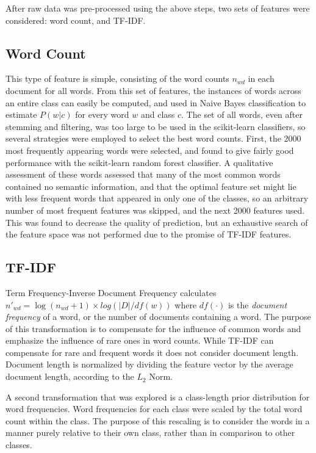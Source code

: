 \documentclass[10pt,twocolumn]{article}
\begin{document}
After raw data was pre-processed using the above steps, two sets of features were considered: word count, and TF-IDF.

\subsection*{Word Count}

This type of feature is simple, consisting of the word counts $n_{wd}$ in each document for all words. From this set of features, the instances of words across an entire class can easily be computed, and used in Naive Bayes classification to estimate $P(w | c)$ for every word $w$ and class $c$. The set of all words, even after stemming and filtering, was too large to be used in the scikit-learn classifiers, so several strategies were employed to select the best word counts.  First, the 2000 most frequently appearing words were selected, and found to give fairly good performance with the scikit-learn random forest classifier.  A qualitative assessment of these words assessed that many of the most common words contained no semantic information, and that the optimal feature set might lie with less frequent words that appeared in only one of the classes, so an arbitrary number of most frequent features was skipped, and the next 2000 features used.  This was found to decrease the quality of prediction, but an exhaustive search of the feature space was not performed due to the promise of TF-IDF features.

\subsection*{TF-IDF}

Term Frequency-Inverse Document Frequency calculates $n'_{wd} = \log (n_{wd} + 1) \times log (|D| / df(w))$ where $df(\cdot)$ is the \emph{document frequency} of a word, or the number of documents containing a word. The purpose of this transformation is to compensate for the influence of common words and emphasize the influence of rare ones in word counts. While TF-IDF can compensate for rare and frequent words it does not consider document length. Document length is normalized by dividing the feature vector by the average document length, according to the $L_2$ Norm.

A second transformation that was explored is a class-length prior distribution for word frequencies. Word frequencies for each class were scaled by the total word count within the class. The purpose of this rescaling is to consider the words in a manner purely relative to their own class, rather than in comparison to other classes.
\end{document}
